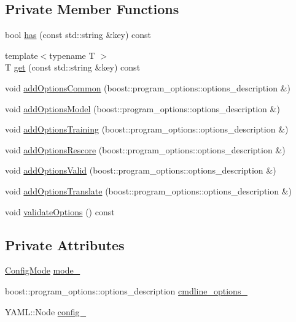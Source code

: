 \subsection*{Private Member Functions}
\begin{DoxyCompactItemize}
\item 
bool \hyperlink{classmarian_1_1ConfigParser_a667e86d91936eb1d19044891b060e987}{has} (const std\+::string \&key) const 
\item 
{\footnotesize template$<$typename T $>$ }\\T \hyperlink{classmarian_1_1ConfigParser_a26aabf7e2d79ed5ec4fa1a1c8d46c719}{get} (const std\+::string \&key) const 
\item 
void \hyperlink{classmarian_1_1ConfigParser_ae77d0dbd400ca620dbf5b053278f4141}{add\+Options\+Common} (boost\+::program\+\_\+options\+::options\+\_\+description \&)
\item 
void \hyperlink{classmarian_1_1ConfigParser_aa2556e888231001b9f4d02cd742939ba}{add\+Options\+Model} (boost\+::program\+\_\+options\+::options\+\_\+description \&)
\item 
void \hyperlink{classmarian_1_1ConfigParser_aed7318279a0412b11ff0a9e23363c12e}{add\+Options\+Training} (boost\+::program\+\_\+options\+::options\+\_\+description \&)
\item 
void \hyperlink{classmarian_1_1ConfigParser_aedbe49f4f858e12c403268b365b46865}{add\+Options\+Rescore} (boost\+::program\+\_\+options\+::options\+\_\+description \&)
\item 
void \hyperlink{classmarian_1_1ConfigParser_a9d7e94d97f2cc1cc7b6fe7e36e7b1f6d}{add\+Options\+Valid} (boost\+::program\+\_\+options\+::options\+\_\+description \&)
\item 
void \hyperlink{classmarian_1_1ConfigParser_a07165d2c1c885c858d8127eb09f00e71}{add\+Options\+Translate} (boost\+::program\+\_\+options\+::options\+\_\+description \&)
\item 
void \hyperlink{classmarian_1_1ConfigParser_abbe3a863f0c0599f1aab53e446291b02}{validate\+Options} () const 
\end{DoxyCompactItemize}
\subsection*{Private Attributes}
\begin{DoxyCompactItemize}
\item 
\hyperlink{namespacemarian_aaddd4b008ff5352b1fe7e16574f7e1f9}{Config\+Mode} \hyperlink{classmarian_1_1ConfigParser_ae3bb2ffc2601222cc53734a60ab1f980}{mode\+\_\+}
\item 
boost\+::program\+\_\+options\+::options\+\_\+description \hyperlink{classmarian_1_1ConfigParser_af57fa6f4fb82e1e5b6068e7dcb56b3b2}{cmdline\+\_\+options\+\_\+}
\item 
Y\+A\+M\+L\+::\+Node \hyperlink{classmarian_1_1ConfigParser_a48aeae345c018ede7fb97d4705d5aeb1}{config\+\_\+}
\end{DoxyCompactItemize}


